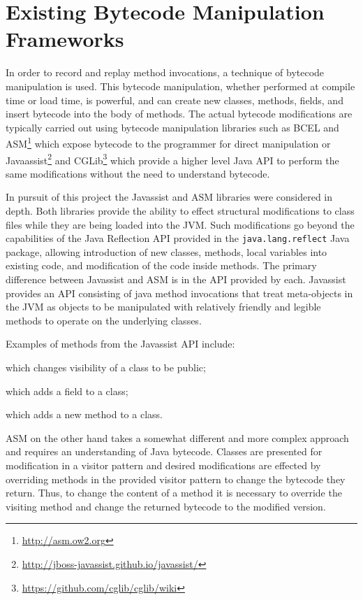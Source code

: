 \documentclass[]{final_report}
\begin{document}
\section{Existing Bytecode Manipulation Frameworks}

In order to record and replay method invocations, a technique of bytecode manipulation is used. This bytecode manipulation, whether performed at compile time or load time, is powerful, and can create new classes, methods, fields, and insert bytecode into the body of methods. The actual bytecode modifications are typically carried out using bytecode manipulation libraries such as BCEL and ASM\footnote{\url{http://asm.ow2.org}} which expose bytecode to the programmer for direct manipulation or Javaassist\footnote{\url{http://jboss-javassist.github.io/javassist/}} and CGLib\footnote{\url{https://github.com/cglib/cglib/wiki}} which provide a higher level Java API to perform the same modifications without the need to understand bytecode.

In pursuit of this project the Javassist and ASM libraries were considered in depth. Both libraries provide the ability to effect structural modifications to class files while they are being loaded into the JVM. Such modifications go beyond the capabilities of the Java Reflection API provided in the \lstinline{java.lang.reflect}\noop{} Java package, allowing introduction of new classes, methods, local variables into existing code, and modification of the code inside methods. The primary difference between Javassist and ASM is in the API provided by each. Javassist provides an API consisting of java method invocations that treat meta-objects in the JVM as objects to be manipulated with relatively friendly and legible methods to operate on the underlying classes.\cite{chiba:2000}

Examples of methods from the Javassist API include:
\begin{description}[style=nextline]
\item[CtClass.bePublic()] which changes visibility of a class to be public;
\item[CtClass.addField()] which adds a field to a class;
\item[CtClass.addMethod()] which adds a new method to a class.
\end{description}

ASM on the other hand takes a somewhat different and more complex approach and requires an understanding of Java bytecode. Classes are presented for modification in a visitor pattern and desired modifications are effected by overriding methods in the provided visitor pattern to change the bytecode they return. Thus, to change the content of a method it is necessary to override the visiting method and change the returned bytecode to the modified version.
\end{document}
